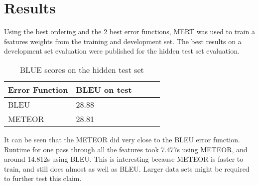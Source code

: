 \documentclass[11pt]{article}
\begin{document}
\section{Results}
Using the best ordering and the 2 best error functions, MERT was used to train a
features weights from the training and development set. The best results on a
development set evaluation were published for the hidden test set evaluation.
 \begin{table}[h]
\begin{center}
\begin{singlespace}
\begin{tabular}{|l|l|l|l|l|}
\hline \bf Error Function &  \bf BLEU on test \\ \hline
BLEU &28.88 \\
METEOR  &28.81 \\
\hline
\end{tabular}
\end{singlespace}
\end{center}
\caption{BLUE scores on the hidden test set}
\end{table}
It can be seen that the METEOR did very close to the BLEU error function. Runtime 
for one pass through all the features took 7.477s using METEOR, and around
14.812s using BLEU.  This is interesting because METEOR is faster to train, and 
still does almost as well as BLEU. Larger data sets might be required to further
test this claim.

{} 
\end{document}
